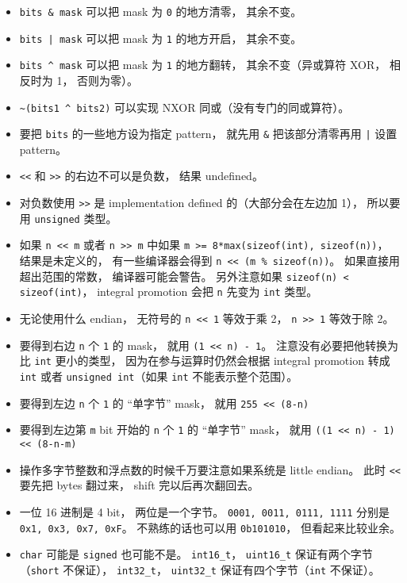 
\begin{issues}
\issueDraft
\end{issues}

\begin{itemize}
\item \verb|bits & mask| 可以把 mask 为 \verb|0| 的地方清零， 其余不变。
\item \verb`bits | mask` 可以把 mask 为 \verb|1| 的地方开启， 其余不变。
\item \verb|bits ^ mask| 可以把 mask 为 \verb|1| 的地方翻转， 其余不变（异或算符 XOR， 相反时为 1， 否则为零）。
\item \verb|~(bits1 ^ bits2)| 可以实现 NXOR 同或（没有专门的同或算符）。
\item 要把 \verb|bits| 的一些地方设为指定 pattern， 就先用 \verb|&| 把该部分清零再用 \verb`|` 设置 pattern。
\item \verb|<<| 和 \verb|>>| 的右边不可以是负数， 结果 undefined。
\item 对负数使用 \verb|>>| 是 implementation defined 的（大部分会在左边加 1）， 所以要用 \verb|unsigned| 类型。
\item 如果 \verb|n << m| 或者 \verb|n >> m| 中如果 \verb|m >= 8*max(sizeof(int), sizeof(n))|， 结果是未定义的， 有一些编译器会得到 \verb|n << (m % sizeof(n))|。 如果直接用超出范围的常数， 编译器可能会警告。 另外注意如果 \verb|sizeof(n) < sizeof(int)|， integral promotion 会把 \verb|n| 先变为 \verb|int| 类型。
\item 无论使用什么 endian， 无符号的 \verb|n << 1| 等效于乘 2， \verb|n >> 1| 等效于除 2。
\item 要得到右边 \verb|n| 个 \verb|1| 的 mask， 就用 \verb|(1 << n) - 1|。 注意没有必要把他转换为比 \verb|int| 更小的类型， 因为在参与运算时仍然会根据 integral promotion 转成 \verb|int| 或者 \verb|unsigned int|（如果 \verb|int| 不能表示整个范围）。
\item 要得到左边 \verb|n| 个 \verb|1| 的 “单字节” mask， 就用 \verb|255 << (8-n)|
\item 要得到左边第 \verb|m| bit 开始的 \verb|n| 个 \verb|1| 的 “单字节” mask， 就用 \verb|((1 << n) - 1) << (8-n-m)|
\item 操作多字节整数和浮点数的时候千万要注意如果系统是 little endian。 此时 \verb|<<| 要先把 bytes 翻过来， shift 完以后再次翻回去。
\item 一位 16 进制是 4 bit， 两位是一个字节。 \verb|0001, 0011, 0111, 1111| 分别是 \verb|0x1, 0x3, 0x7, 0xF|。 不熟练的话也可以用 \verb|0b101010|， 但看起来比较业余。
\item \verb|char| 可能是 \verb|signed| 也可能不是。 \verb|int16_t|， \verb|uint16_t| 保证有两个字节（\verb|short| 不保证）， \verb|int32_t|， \verb|uint32_t| 保证有四个字节（\verb|int| 不保证）。
\end{itemize}
